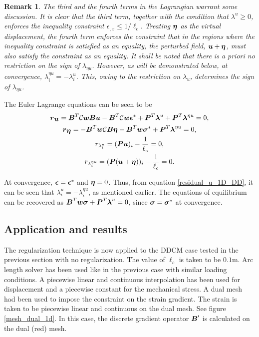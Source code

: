 \documentclass[11pt]{elsarticle}
\newtheorem*{remark}{Remark}
\begin{document}
\begin{remark}
	The third and the fourth terms in the Lagrangian warrant some discussion. It is clear that the third term, together with the condition that $\lambda^u\geq0$, enforces the inequality constraint $\epsilon_{,x} \leq 1/\ell_c$. Treating $\mbox{\boldmath $\eta$}$ as the virtual displacement, the fourth term enforces the constraint that in the regions where the inequality constraint is satisfied as an equality, the perturbed field, $\mbox{\boldmath $u$}+\mbox{\boldmath $\eta$}$, must also satisfy the constraint as an equality. It shall be noted that there is a priori no restriction on the sign of $\lambda_{\eta u}$. However, as will be demonstrated below, at convergence, $\lambda^{\eta u}_i = -\lambda^{ u}_i$. This, owing to the restriction on $\lambda_u$, determines the sign of $\lambda_{\eta u}$.
\end{remark}

 


The Euler Lagrange equations can be seen to be
\begin{gather}
	\mbox{\boldmath $r$}_{\mbox{\boldmath $u$}} = \mbox{\boldmath $B$}^T \mathcal{C}\mbox{\boldmath $w$} \mbox{\boldmath $B$} \mbox{\boldmath $u$} - \mbox{\boldmath $B$}^T \mathcal{C}\mbox{\boldmath $w$} \mbox{\boldmath $\epsilon$} ^* + \mbox{\boldmath $P$}^T \mbox{\boldmath $\lambda$}^u +\mbox{\boldmath $P$}^T \mbox{\boldmath $\lambda$}^{\eta u}  =0, \label{residual_u_1D_DD} \\
	\mbox{\boldmath $r$}_{\mbox{\boldmath $\eta$}} = -\mbox{\boldmath $B$}^T\mbox{\boldmath $w$} \mathcal{C} \mbox{\boldmath $B$} \mbox{\boldmath $\eta$} - \mbox{\boldmath $B$}^T\mbox{\boldmath $w$} \mbox{\boldmath $\sigma$} ^* +\mbox{\boldmath $P$}^T \mbox{\boldmath $\lambda$}^{\eta u} =0, \\
	r_{\lambda^u_i} =  (\mbox{\boldmath $P$} \mbox{\boldmath $u$})_i - \frac{1}{\ell_c}  =0, \\
	r_{\lambda^{\eta u}_i} =  (\mbox{\boldmath $P$} (\mbox{\boldmath $u$} + \mbox{\boldmath $\eta$}))_i - \frac{1}{\ell_c}  =0. 
\end{gather}

At convergence, $\mbox{\boldmath $\epsilon$}=\mbox{\boldmath $\epsilon$}^*$ and $\mbox{\boldmath $\eta$}=0$. Thus, from equation \ref{residual_u_1D_DD}, it can be seen that $\lambda^u_i = -\lambda^{\eta u}_i$, as mentioned earlier. The equations of equilibrium can be recovered as $\mbox{\boldmath $B$}^T \mbox{\boldmath $w$} \mbox{\boldmath $\sigma$} +\mbox{\boldmath $P$}^T \mbox{\boldmath $\lambda$}^{u} =0$, since $\mbox{\boldmath $\sigma$} = \mbox{\boldmath $\sigma$}^*$ at convergence.

\subsection{Application and results}
The regularization technique is now applied to the DDCM case tested in the previous section with no regularization. The value of $\ell_c$ is taken to be $0.1\si{\meter}$. Arc length solver has been used like in the previous case with similar loading conditions. A piecewise linear and continuous interpolation has been used for displacement and a piecewise constant for the mechanical stress. A dual mesh had been used to impose the constraint on the strain gradient. The strain is taken to be piecewise linear and continuous on the dual mesh. See figure \ref{mesh_dual_1d}. In this case, the discrete gradient operator $\mbox{\boldmath $B$}'$ is calculated on the dual (red) mesh.
\end{document}
